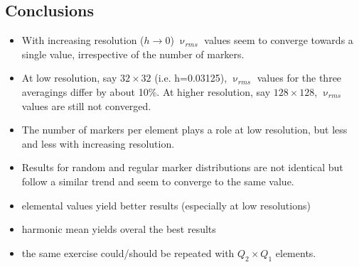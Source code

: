\subsection*{Conclusions}

\begin{itemize}
\item
With increasing resolution ($h\rightarrow 0$) $\upnu_{rms}$ 
values seem to converge towards a single value, irrespective 
of the number of markers. 

\item
At low resolution, say $32\times 32$ (i.e. h=0.03125), $\upnu_{rms}$ 
values for the three averagings differ by about 10\%. 
At higher resolution, say $128\times 128$, $\upnu_{rms}$ 
values are still not converged.  

\item
The number of markers per element plays a role at low resolution, 
but less and less with increasing resolution. 

\item
Results for random and regular marker distributions are not 
identical but follow a similar trend and seem to converge to 
the same value.

\item  elemental values yield better results (especially at low resolutions)

\item harmonic mean yields overal the best results

\item the same exercise could/should be repeated with $Q_2\times Q_1$ elements.
\end{itemize}

